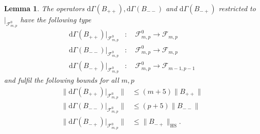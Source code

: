 \documentclass[b5paper,draft,openbib,12pt]{memoir}
\newtheorem{Lemma}[Def]{Lemma}
\begin{document}
\begin{Lemma}\label{d Gamma norms}
The operators 
\(\mathrm{d}\Gamma(B_{++}),\mathrm{d}\Gamma(B_{--})\) and 
\(\mathrm{d}\Gamma(B_{-+})\) 
restricted to \(|_{\mathcal{F}^0_{m,p}}\) have the following 
type
\begin{align}
\mathrm{d}\Gamma(B_{++})|_{\mathcal{F}^0_{m,p}}&: \quad \mathcal{F}^0_{m,p} \rightarrow \mathcal{F}_{m,p}\\
\mathrm{d}\Gamma(B_{--})|_{\mathcal{F}^0_{m,p}}&: \quad \mathcal{F}^0_{m,p} \rightarrow \mathcal{F}_{m,p}\\
\mathrm{d}\Gamma(B_{-+})|_{\mathcal{F}^0_{m,p}}&: \quad \mathcal{F}^0_{m,p} \rightarrow \mathcal{F}_{m-1,p-1}
\end{align}
 and fulfil
the following bounds for all \(m,p\)
\begin{align}
\|\mathrm{d}\Gamma(B_{++})|_{\mathcal{F}^0_{m,p}}\|&\le (m+5)\|B_{++}\|\\
\|\mathrm{d}\Gamma(B_{--})|_{\mathcal{F}^0_{m,p}}\|&\le (p+5)\|B_{--}\|\\
\|\mathrm{d}\Gamma(B_{-+})|_{\mathcal{F}^0_{m,p}}\|&\le \|B_{-+}\|_{\text{HS}}.
\end{align}
\end{Lemma}
\end{document}
